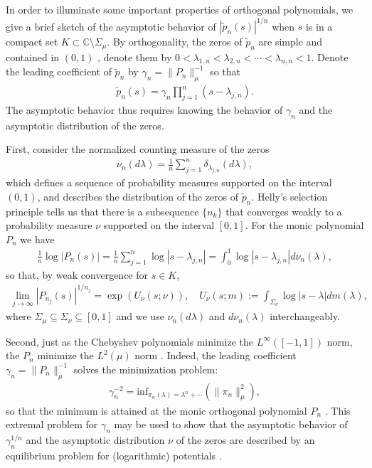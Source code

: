 \documentclass[english,12pt]{ttuthes}
\begin{document}
In order to illuminate some important properties of orthogonal
polynomials, we give a brief sketch of the asymptotic behavior of
$|\tilde{p}_n(s)|^{1/n}$ when $s$ is in a compact set
$K\subset\mathbb{C}\text{\textbackslash}\Sigma_\mu$. By orthogonality, the zeros of
$\tilde{p}_n$ are simple and contained in $(0,1)$ \cite{Deift:2000:RMT},
denote them by $0<\lambda_{1,n}<\lambda_{2,n}<\cdots <\lambda_{n,n}<1$. Denote the leading
coefficient of $\tilde{p}_n$ by $\gamma_n=\|P_n\|_{\mu}^{-1}$ so that
%
\begin{align}
 \tilde{p}_n(s)= \gamma_n\prod_{j=1}^n(s-\lambda_{j,n}).
\end{align}
%
The asymptotic behavior thus requires knowing the behavior of $\gamma_n$ and
the asymptotic distribution of the zeros.

First, consider the normalized counting measure of the zeros
%
\begin{align}
  \nu_n(d\lambda)=\frac{1}{n}\sum_{j=1}^n\delta_{\lambda_{j,n}}(d\lambda),
\end{align}
%
which defines a sequence of probability measures supported on the
interval $(0,1)$, and describes the distribution of the zeros of
$\tilde{p}_n$. Helly's selection principle tells us
\cite{Assche:SAT:2006,Deift:2000:RMT} that there is a subsequence
$\{n_k\}$ that converges weakly to a probability measure $\nu$ supported
on the interval $[0,1]$. For the monic polynomial $P_n$ we have   
%
\begin{align}
  \frac{1}{n}\log|P_n(s)|=\frac{1}{n}\sum_{j=1}^n\log|s-\lambda_{j,n}|
                        =\int_0^1\log|s-\lambda_{j,n}|d\nu_n(\lambda),
\end{align}
%
so that, by weak convergence for $s\in K$,
%
\begin{align}\label{eq:Pn_asymptotics}
  \lim_{j\to\infty}|P_{n_j}(s)|^{1/n_j}=\exp\left(U_{\nu}(s;\nu)\right), \quad
  U_\nu(s;m):=\int_{\Sigma_\nu}\log|s-\lambda|dm(\lambda),
\end{align}
%
where $\Sigma_\mu\subseteq\Sigma_\nu\subseteq[0,1]$ and we use $\nu_n(d\lambda)$ and $d\nu_n(\lambda)$ interchangeably.

Second, just as the Chebyshev polynomials minimize the $L^\infty([-1,1])$
norm, the $P_n$ minimize the $L^2(\mu)$ norm
\cite{Deift:2000:RMT}. Indeed, the leading coefficient
$\gamma_n=\|P_n\|_{\mu}^{-1}$ solves the minimization problem: 
%
\begin{align}
  \gamma_n^{-2}=\text{inf}_{\pi_{n}(\lambda)=\lambda^n+\cdots}(\|\pi_n\|_{\mu}^2),
\end{align}
%
so that the minimum is attained at the monic orthogonal polynomial
$P_n$ \cite{Assche:SAT:2006}. This extremal problem for $\gamma_n$ may be
used to show that the asymptotic behavior of $\gamma_n^{1/n}$ and the
asymptotic distribution $\nu$ of the zeros are described by an
equilibrium problem for (logarithmic) potentials
\cite{Assche:SAT:2006}.
\end{document}
